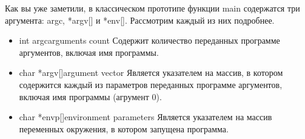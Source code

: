 Как вы уже заметили, в классическом прототипе функции main содержатся три аргумента: argc, *argv[] и *env[]. Рассмотрим каждый из них подробнее.

	\begin{itemize}
		
		\item
			\begin{myenv}{int argc}{arguments count}
				Содержит количество переданных программе аргументов, включая имя программы.
			\end{myenv}
			
		\item
			\begin{myenv}{char *argv[]}{argument vector}
				Является указателем на массив, в котором содержится каждый из параметров переданных программе аргументов, включая имя программы (агрумент 0).
			\end{myenv}
			
		\item
			\begin{myenv}{char *envp[]}{environment parameters}
				Является указателем на массив переменных окружения, в котором запущена программа.
			\end{myenv}
				
	\end{itemize}